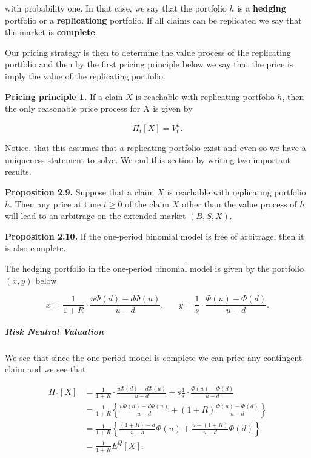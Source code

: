 \documentclass[
]{article}
\begin{document}
with probability one. In that case, we say that the portfolio \(h\) is a
\textbf{hedging} portfolio or a \textbf{replicationg} portfolio. If all
claims can be replicated we say that the market is \textbf{complete}.

Our pricing strategy is then to determine the value process of the
replicating portfolio and then by the first pricing principle below we
say that the price is imply the value of the replicating portfolio.

\textbf{Pricing principle 1.} If a clain \(X\) is reachable with
replicating portfolio \(h\), then the only reasonable price process for
\(X\) is given by

\[
\Pi_t[X]=V_t^h.
\]

Notice, that this assumes that a replicating portfolio exist and even so
we have a uniqueness statement to solve. We end this section by writing
two important results.

\textbf{Proposition 2.9.} Suppose that a claim \(X\) is reachable with
replicating portfolio \(h\). Then any price at time \(t\ge 0\) of the
claim \(X\) other than the value process of \(h\) will lead to an
arbitrage on the extended market \((B,S,X)\).

\textbf{Proposition 2.10.} If the one-period binomial model is free of
arbitrage, then it is also complete.

The hedging portfolio in the one-period binomial model is given by the
portfolio \((x,y)\) below

\[
x=\frac{1}{1+R}\cdot\frac{u\Phi(d)-d\Phi(u)}{u-d},\hspace{20pt}y=\frac{1}{s}\cdot\frac{\Phi(u)-\Phi(d)}{u-d}.
\]

\hypertarget{risk-neutral-valuation}{%
\subparagraph{Risk Neutral Valuation}\label{risk-neutral-valuation}}

We see that since the one-period model is complete we can price any
contingent claim and we see that

\begin{align*}
\Pi_0[X]&=\frac{1}{1+R}\cdot\frac{u\Phi(d)-d\Phi(u)}{u-d}+s\frac{1}{s}\cdot\frac{\Phi(u)-\Phi(d)}{u-d}\\
&=\frac{1}{1+R}\left\{\frac{u\Phi(d)-d\Phi(u)}{u-d}+(1+R)\frac{\Phi(u)-\Phi(d)}{u-d}\right\}\\
&=\frac{1}{1+R}\left\{\frac{(1+R)-d}{u-d}\Phi(u)+\frac{u-(1+R)}{u-d}\Phi(d)\right\}\\
&=\frac{1}{1+R}E^Q[X].
\end{align*}
\end{document}
